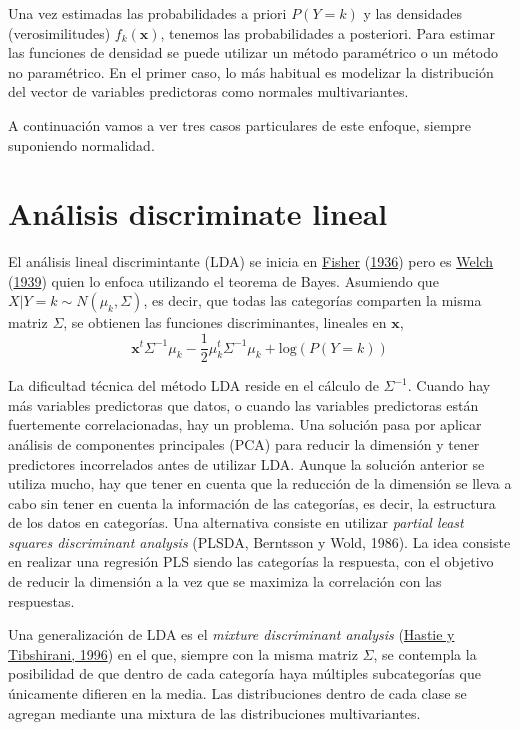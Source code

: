 \documentclass[
  spanish,
]{book}
\theoremstyle{break}
\theoremstyle{definition}
\theoremstyle{definition}
\theoremstyle{definition}
\theoremstyle{definition}
\theoremstyle{remark}
\begin{document}
Una vez estimadas las probabilidades a priori \(P(Y = k)\) y las densidades (verosimilitudes) \(f_k(\mathbf{x})\), tenemos las probabilidades a posteriori. Para estimar las funciones de densidad se puede utilizar un método paramétrico o un método no paramétrico. En el primer caso, lo más habitual es modelizar la distribución del vector de variables predictoras como normales multivariantes.

A continuación vamos a ver tres casos particulares de este enfoque, siempre suponiendo normalidad.

\hypertarget{anuxe1lisis-discriminate-lineal}{%
\section{Análisis discriminate lineal}\label{anuxe1lisis-discriminate-lineal}}

El análisis lineal discrimintante (LDA) se inicia en \protect\hyperlink{ref-fisher1936use}{Fisher} (\protect\hyperlink{ref-fisher1936use}{1936}) pero es \protect\hyperlink{ref-welch1939note}{Welch} (\protect\hyperlink{ref-welch1939note}{1939}) quien lo enfoca utilizando el teorema de Bayes. Asumiendo que \(X | Y = k \sim N(\mu_k, \Sigma)\), es decir, que todas las categorías comparten la misma matriz \(\Sigma\), se obtienen las funciones discriminantes, lineales en \(\mathbf{x}\),
\[\mathbf{x}^t \Sigma^{-1} \mu_k - \frac{1}{2} \mu_k^t \Sigma^{-1} \mu_k + \mbox{log}(P(Y = k))\]

La dificultad técnica del método LDA reside en el cálculo de \(\Sigma^{-1}\). Cuando hay más variables predictoras que datos, o cuando las variables predictoras están fuertemente correlacionadas, hay un problema. Una solución pasa por aplicar análisis de componentes principales (PCA) para reducir la dimensión y tener predictores incorrelados antes de utilizar LDA. Aunque la solución anterior se utiliza mucho, hay que tener en cuenta que la reducción de la dimensión se lleva a cabo sin tener en cuenta la información de las categorías, es decir, la estructura de los datos en categorías. Una alternativa consiste en utilizar \emph{partial least squares discriminant analysis} (PLSDA, Berntsson y Wold, 1986). La idea consiste en realizar una regresión PLS siendo las categorías la respuesta, con el objetivo de reducir la dimensión a la vez que se maximiza la correlación con las respuestas.

Una generalización de LDA es el \emph{mixture discriminant analysis} (\protect\hyperlink{ref-hastie1996fisher}{Hastie y Tibshirani, 1996}) en el que, siempre con la misma matriz \(\Sigma\), se contempla la posibilidad de que dentro de cada categoría haya múltiples subcategorías que únicamente difieren en la media. Las distribuciones dentro de cada clase se agregan mediante una mixtura de las distribuciones multivariantes.
\end{document}
